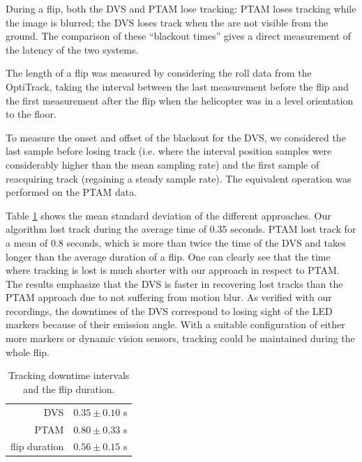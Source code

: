 During a flip, both the DVS and PTAM lose tracking: PTAM loses tracking
while the image is blurred; the DVS loses track when the \ALMs are
not visible from the ground. The comparison of these ``blackout times''
gives a direct measurement of the latency of the two systems. 



The length of a flip was measured by considering the roll data from
the OptiTrack, taking the interval between the last measurement before
the flip and the first measurement after the flip when the helicopter
was in a level orientation to the floor. 

To measure the onset and offset of the blackout for the DVS, we considered
the last sample before losing track (i.e. where the interval position
samples were considerably higher than the mean sampling rate) and
the first sample of reacquiring track (regaining a steady sample rate).
The equivalent operation was performed on the PTAM data. 



Table \ref{tab:downtime_tab} shows the mean standard deviation of
the different approaches. Our algorithm lost track during the average
time of 0.35 seconds. PTAM lost track for a mean of 0.8 seconds, which
is more than twice the time of the DVS and takes longer than the average
duration of a flip. One can clearly see that the time where tracking
is lost is much shorter with our approach in respect to PTAM. The
results emphasize that the DVS is faster in recovering lost tracks
than the PTAM approach due to not suffering from motion blur. As verified
with our recordings, the downtimes of the DVS correspond to losing
sight of the LED markers because of their emission angle. With a suitable
configuration of either more markers or dynamic vision sensors, tracking
could be maintained during the whole flip. 

\begin{table}
\caption{\label{tab:downtime_tab} Tracking downtime intervals and the flip
duration.}
\vspace{-2mm}\centering%
\begin{tabular}{r|l}
\rule{0pt}{1em}DVS  & $0.35\pm0.10$ s\tabularnewline
PTAM  & $0.80\pm0.33$ s\tabularnewline
flip duration & $0.56\pm0.15$ s\tabularnewline
\end{tabular}\vspace{-2mm}
\end{table}








